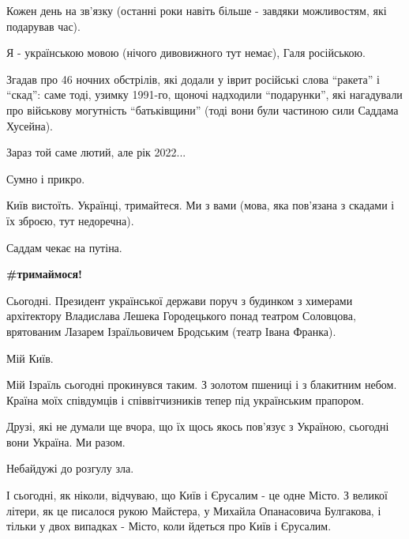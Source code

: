 Кожен день на зв'язку (останні роки навіть більше - завдяки можливостям, які
подарував час).

Я - українською мовою (нічого дивовижного тут немає), Галя російською.

Згадав про 46 ночних обстрілів, які додали у іврит російські слова \enquote{ракета} і
\enquote{скад}: саме тоді, узимку 1991-го, щоночі надходили \enquote{подарунки}, які нагадували
про військову могутність \enquote{батьківщини} (тоді вони були частиною сили Саддама
Хусейна).

Зараз той саме лютий, але рік 2022...

Сумно і прикро. 

Київ вистоїть. Українці, тримайтеся. Ми з вами (мова, яка пов'язана з скадами і
їх зброєю, тут недоречна).

Саддам чекає на путіна.

\textbf{\#тримаймося!}

Сьогодні. Президент української держави поруч з будинком з химерами архітектору
Владислава Лешека Городецького понад театром Соловцова, врятованим Лазарем
Ізраїльовичем Бродським (театр Івана Франка).

Мій Київ.

Мій Ізраїль сьогодні прокинувся таким. З золотом пшениці і з блакитним небом.
Країна моїх співдумців і співвітчизників тепер під українським прапором.

Друзі, які не думали ще вчора, що їх щось якось пов'язує з Україною, сьогодні
вони Україна. Ми разом.

Небайдужі до розгулу зла.

І сьогодні, як ніколи, відчуваю, що Київ і Єрусалим - це одне Місто. З великої
літери, як це писалося рукою Майстера, у Михайла Опанасовича Булгакова, і
тільки у двох випадках - Місто, коли йдеться про Київ і Єрусалим.
